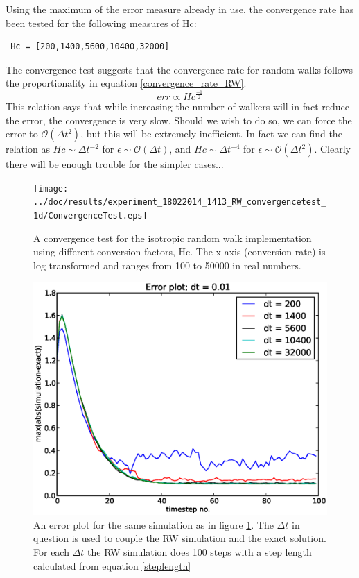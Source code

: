 Using the maximum of the error measure already in use, the convergence rate has been tested for the following measures of Hc:
\begin{lstlisting}
 Hc = [200,1400,5600,10400,32000]
\end{lstlisting}

The convergence test suggests that the convergence rate for random walks follows the proportionality in equation \eqref{convergence_rate_RW}. 
\begin{equation}\label{convergence_rate_RW}
err \propto Hc^{\frac{-1}{2}}
\end{equation}
This relation says that while increasing the number of walkers will in fact reduce the error, the convergence is very slow. 
Should we wish to do so, we can force the error to $\mathcal{O}(\Delta t^2)$, but this will be extremely inefficient. In fact we can find the relation as $Hc\sim\Delta t^{-2}$ for $\epsilon\sim\mathcal{O}(\Delta t)$, and $Hc\sim\Delta t^{-4}$ for $\epsilon\sim\mathcal{O}(\Delta t^2)$. 
Clearly there will be enough trouble for the simpler cases...



\begin{figure}[H]
 \centering
 \texttt{[image: ../doc/results/experiment\_18022014\_1413\_RW\_convergencetest\_1d/ConvergenceTest.eps]}
 \caption[Convergence test RW]{A convergence test for the isotropic random walk implementation using different conversion factors, Hc. The x axis (conversion rate) is log transformed and ranges from 100 to 50000 in real numbers.}
 \label{ConvergenceTestRW}
\end{figure}
\begin{figure}[H]
 \centering
 \includegraphics[scale=0.7]{../doc/results/experiment_18022014_1413_RW_convergencetest_1d/results/errorplot.eps}
 \caption[Error plot RW]{An error plot for the same simulation as in figure \ref{ConvergenceTestRW}. The $\Delta t$ in question is used to couple the RW simulation and the exact solution. For each $\Delta t$ the RW simulation does 100 steps with a step length calculated from equation \eqref{steplength}}
\end{figure}




